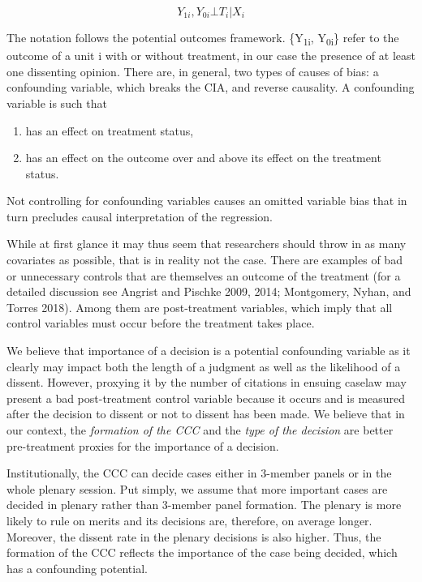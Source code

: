 \documentclass[
  11pt,
]{article}
\providecommand{\tightlist}{%
  \setlength{\itemsep}{0pt}\setlength{\parskip}{0pt}}
\begin{document}
\[
{Y_{1i}, Y_{0i}} {\bot} T_{i}|X_{i}
\]

The notation follows the potential outcomes framework.
\{Y\textsubscript{1i}, Y\textsubscript{0i}\} refer to the outcome of a
unit i with or without treatment, in our case the presence of at least
one dissenting opinion. There are, in general, two types of causes of
bias: a confounding variable, which breaks the CIA, and reverse
causality. A confounding variable is such that

\begin{enumerate}
\def\labelenumi{(\arabic{enumi})}
\tightlist
\item
  has an effect on treatment status,
\item
  has an effect on the outcome over and above its effect on the
  treatment status.
\end{enumerate}

Not controlling for confounding variables causes an omitted variable
bias that in turn precludes causal interpretation of the regression.

While at first glance it may thus seem that researchers should throw in
as many covariates as possible, that is in reality not the case. There
are examples of bad or unnecessary controls that are themselves an
outcome of the treatment (for a detailed discussion see Angrist and
Pischke 2009, 2014; Montgomery, Nyhan, and Torres 2018). Among them are
post-treatment variables, which imply that all control variables must
occur before the treatment takes place.

We believe that importance of a decision is a potential confounding
variable as it clearly may impact both the length of a judgment as well
as the likelihood of a dissent. However, proxying it by the number of
citations in ensuing caselaw may present a bad post-treatment control
variable because it occurs and is measured after the decision to dissent
or not to dissent has been made. We believe that in our context, the
\emph{formation of the CCC} and the \emph{type of the decision} are
better pre-treatment proxies for the importance of a decision.

Institutionally, the CCC can decide cases either in 3-member panels or
in the whole plenary session. Put simply, we assume that more important
cases are decided in plenary rather than 3-member panel formation. The
plenary is more likely to rule on merits and its decisions are,
therefore, on average longer. Moreover, the dissent rate in the plenary
decisions is also higher. Thus, the formation of the CCC reflects the
importance of the case being decided, which has a confounding potential.
\end{document}
